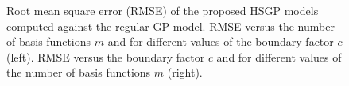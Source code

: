 \documentclass[onecolumn,a4paper,11pt]{article}
\begin{document}
\begin{figure}
\caption{Root mean square error (RMSE) of the proposed HSGP models computed against the regular GP model. RMSE versus the number of basis functions $m$ and for different values of the boundary factor $c$ (left). RMSE versus the boundary factor $c$ and for different values of the number of basis functions $m$ (right). }
  \label{fig4_MSE_vs_J}
\end{figure}

\begin{figure}
\centering
{}

\end{figure}
\end{document}
